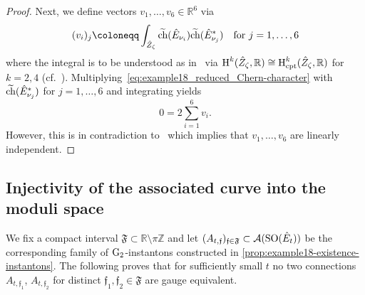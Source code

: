 \documentclass[11pt,a4paper]{scrartcl}
\newcommand{\G}{\textup{G}}
\newcommand{\SO}{\textup{SO}}
\renewcommand{\H}{\textup{H}}
\numberwithin{equation}{section}
\theoremstyle{plain}
\theoremstyle{definition}
\theoremstyle{remark}
\begin{document}
\begin{proof}
Next, we define vectors $v_1,\dots,v_6 \in \mathbb{R}^6$ via \[ (v_i)_j \coloneqq \int_{\hat{Z}_\zeta} \widetilde{\textup{ch}}(\hat{E}_{\nu_i})\widetilde{\textup{ch}}(\hat{E}_{\nu_j}^*) \quad \textup{for $j=1,\dots,6$} \] where the integral is to be understood as in~\cite[Section~7]{WalpuskiDegeratu-HYM_on_crepant_resolutions} via $\H^k(\hat{Z}_\zeta,\mathbb{R})\cong \H^k_{\textup{cpt}}(\hat{Z}_\zeta,\mathbb{R})$ for $k=2,4$ (cf.~\cite[Section~7]{WalpuskiDegeratu-HYM_on_crepant_resolutions}). Multiplying~\eqref{eq:example18_reduced_Chern-character} with $\widetilde{\textup{ch}}(\hat{E}_{\nu_j}^*)$ for $j=1,\dots,6$ and integrating yields \[0 = 2 \sum_{i=1}^6 v_i.\] However, this is in contradiction to~\cite[Equation~(1.8)]{WalpuskiDegeratu-HYM_on_crepant_resolutions} which implies that $v_1,\dots,v_6$ are linearly independent.
\end{proof}

\subsection{Injectivity of the associated curve into the moduli space}

We fix a compact interval $\mathfrak{F}  \subset \mathbb{R}\setminus \pi \mathbb{Z}$ and let $(A_{t,\mathfrak{f}})_{\mathfrak{f} \in \mathfrak{F}} \subset \mathcal{A}(\SO(\hat{E}_{t}))$ be the corresponding family of $\G_2$-instantons constructed in \autoref{prop:example18-existence-instantons}. The following proves that for sufficiently small $t$ no two connections $A_{t,\mathfrak{f}_1}$, $A_{t,\mathfrak{f}_2}$ for distinct $\mathfrak{f}_1,\mathfrak{f}_2 \in \mathfrak{F}$ are gauge equivalent.
\end{document}
